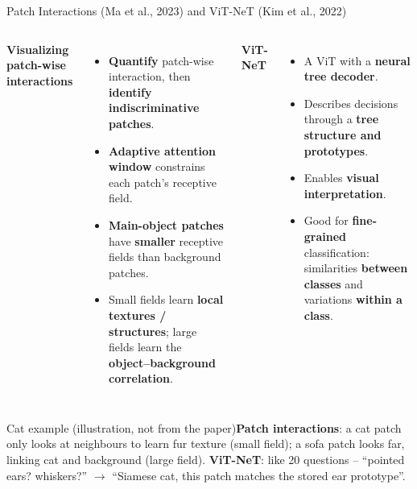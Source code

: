 \documentclass[10pt]{beamer}
\newcommand{\highlight}[1]{\textcolor{myNewColorA}{\textbf{#1}}}
\newcommand{\catex}[1]{\begin{exampleblock}{\footnotesize Cat example (illustration, not from the paper)}\footnotesize #1\end{exampleblock}}
\begin{document}
\begin{frame}{Patch Interactions (Ma et al., 2023) and ViT-NeT (Kim et al., 2022)}
\begin{columns}[T]
\textbf{Visualizing patch-wise interactions}
\begin{itemize}\small
  \item \textbf{Quantify} patch-wise interaction, then \textbf{identify indiscriminative patches}.
  \item \highlight{Adaptive attention window} constrains each patch's receptive field.
  \item \textbf{Main-object patches} have \textbf{smaller} receptive fields than background patches.
  \item Small fields learn \textbf{local textures / structures}; large fields learn the \textbf{object--background correlation}.
\end{itemize}
\textbf{ViT-NeT}
\begin{itemize}\small
  \item A ViT with a \highlight{neural tree decoder}.
  \item Describes decisions through a \textbf{tree structure and prototypes}.
  \item Enables \textbf{visual interpretation}.
  \item Good for \textbf{fine-grained} classification: similarities \textbf{between classes} and variations \textbf{within a class}.
\end{itemize}
\end{columns}
\vspace{0.2em}
\catex{\textbf{Patch interactions}: a cat patch only looks at neighbours to learn fur texture (small field); a sofa patch looks far, linking cat and background (large field). \textbf{ViT-NeT}: like 20 questions -- ``pointed ears? whiskers?'' $\to$ ``Siamese cat, this patch matches the stored ear prototype''.}
\end{frame}
\end{document}
